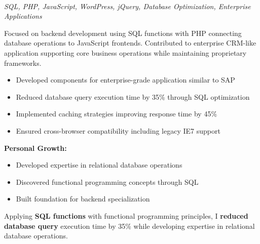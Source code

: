 \documentclass[a4paper,10pt]{article}
\begin{document}
\nopagebreak

\noindent
\vspace{0.4cm}
{%
	\begin{minipage}{\dimexpr\textwidth-2\fboxsep\relax}

        \noindent\uline{} \\
        \vspace{0.1cm} \hspace{0.2cm}
		{\small\textit{SQL, PHP, JavaScript, WordPress, jQuery, Database Optimization, Enterprise Applications}}

		Focused on backend development using SQL functions with PHP connecting database operations to JavaScript frontends. Contributed to enterprise CRM-like application supporting core business operations while maintaining proprietary frameworks.

		\vspace{0.2cm}
		\begin{itemize}[label=\textcolor{darkblue}{\textbullet}, leftmargin=*, nosep]
			\item Developed components for enterprise-grade application similar to SAP
			\item Reduced database query execution time by 35\% through SQL optimization
			\item Implemented caching strategies improving response time by 45\%
			\item Ensured cross-browser compatibility including legacy IE7 support
		\end{itemize}

		\vspace{0.2cm}
		\textbf{Personal Growth:}
		\vspace{0.2cm}
		\begin{itemize}[label=\textcolor{darkblue}{\textbullet}, leftmargin=*, nosep]
			\item Developed expertise in relational database operations
			\item Discovered functional programming concepts through SQL
			\item Built foundation for backend specialization
		\end{itemize}

        \vspace{0.2cm}

        Applying \textbf{SQL functions} with functional programming principles,
        I \textbf{reduced database query} execution time by 35\% while developing expertise in
        relational database operations.




\end{minipage}}
\end{document}
